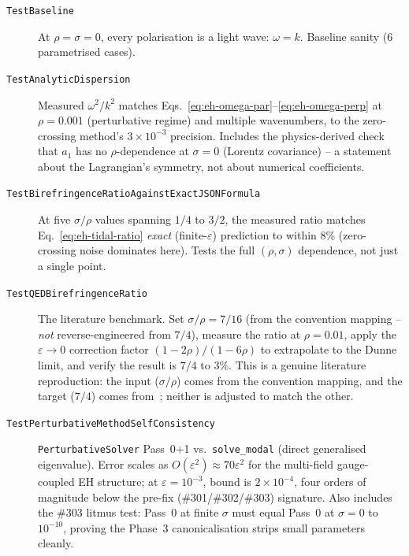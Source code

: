 \begin{description}
  \item[\texttt{TestBaseline}] At $\rho = \sigma = 0$, every polarisation is a light wave: $\omega = k$. Baseline sanity (6 parametrised cases).
  \item[\texttt{TestAnalyticDispersion}] Measured $\omega^2/k^2$ matches Eqs.~\eqref{eq:eh-omega-par}--\eqref{eq:eh-omega-perp} at $\rho = 0.001$ (perturbative regime) and multiple wavenumbers, to the zero-crossing method's $3\times10^{-3}$ precision. Includes the physics-derived check that $a_1$ has no $\rho$-dependence at $\sigma = 0$ (Lorentz covariance) -- a statement about the Lagrangian's symmetry, not about numerical coefficients.
  \item[\texttt{TestBirefringenceRatioAgainstExactJSONFormula}] At five $\sigma/\rho$ values spanning $1/4$ to $3/2$, the measured ratio matches Eq.~\eqref{eq:eh-tidal-ratio} \emph{exact} (finite-$\varepsilon$) prediction to within 8\% (zero-crossing noise dominates here). Tests the full $(\rho, \sigma)$ dependence, not just a single point.
  \item[\texttt{TestQEDBirefringenceRatio}] The literature benchmark. Set $\sigma/\rho = 7/16$ (from the convention mapping -- \emph{not} reverse-engineered from $7/4$), measure the ratio at $\rho = 0.01$, apply the $\varepsilon \to 0$ correction factor $(1-2\rho)/(1-6\rho)$ to extrapolate to the Dunne limit, and verify the result is $7/4$ to 3\%. This is a genuine literature reproduction: the input ($\sigma/\rho$) comes from the convention mapping, and the target ($7/4$) comes from~\cite{Adler1971,Dunne2004}; neither is adjusted to match the other.
  \item[\texttt{TestPerturbativeMethodSelfConsistency}] \texttt{PerturbativeSolver} Pass~0+1 vs.\ \texttt{solve\_modal} (direct generalised eigenvalue). Error scales as $O(\varepsilon^2) \approx 70 \varepsilon^2$ for the multi-field gauge-coupled EH structure; at $\varepsilon = 10^{-3}$, bound is $2\times10^{-4}$, four orders of magnitude below the pre-fix (\#301/\#302/\#303) signature. Also includes the \#303 litmus test: Pass~0 at finite $\sigma$ must equal Pass~0 at $\sigma = 0$ to $10^{-10}$, proving the Phase~3 canonicalisation strips small parameters cleanly.

\end{description}
